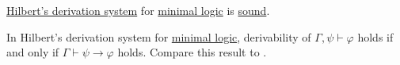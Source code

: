 \begin{theorem}\label{thm:soundness_of_hilberts_derivation_system}
  \hyperref[def:hilberts_derivation_system]{Hilbert's derivation system} for \hyperref[rem:hilberts_derivation_system_axioms/minimal_logic]{minimal logic} is \hyperref[def:derivability_and_satisfiability/soundness]{sound}.
\end{theorem}

\begin{theorem}\label{thm:deduction_theorem}
  In Hilbert's derivation system for \hyperref[rem:hilberts_derivation_system_axioms/minimal_logic]{minimal logic}, derivability of \( \Gamma, \psi \vdash \varphi \) holds if and only if \( \Gamma \vdash \psi \rightarrow \varphi \) holds. Compare this result to .
\end{theorem}
